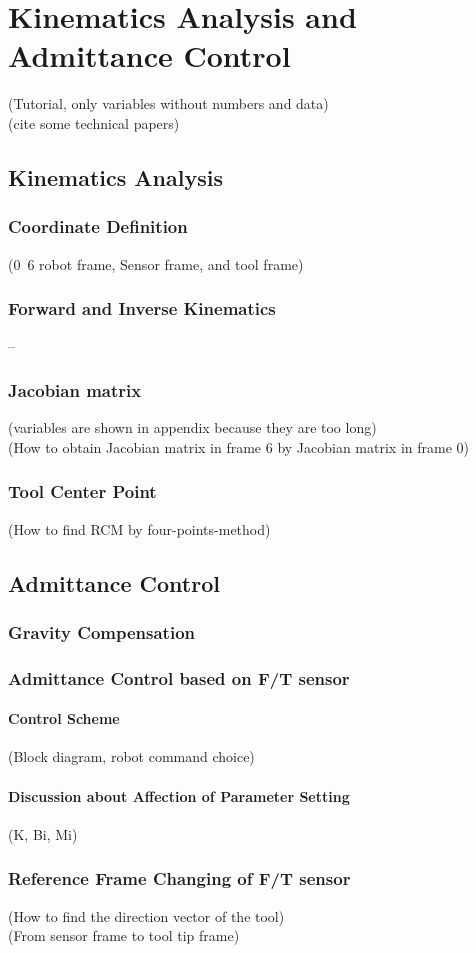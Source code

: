 \chapter{Kinematics Analysis and Admittance Control}
(Tutorial, only variables without numbers and data) 													\\
(cite some technical papers)						
\section{Kinematics Analysis}
\subsection{Coordinate Definition}
(0~6 robot frame, Sensor frame, and tool frame)
\subsection{Forward and Inverse Kinematics}
--
\subsection{Jacobian matrix} 
(variables are shown in appendix because they are too long)												\\
(How to obtain Jacobian matrix in frame 6 by Jacobian matrix in frame 0)								
\subsection{Tool Center Point}
(How to find RCM by four-points-method)
\section{Admittance Control}
\subsection{Gravity Compensation}
\subsection{Admittance Control based on F/T sensor}
\subsubsection{Control Scheme}
(Block diagram, robot command choice)
\subsubsection{Discussion about Affection of Parameter Setting}
(K, Bi, Mi)
\subsection{Reference Frame Changing of F/T sensor}
(How to find the direction vector of the tool)															\\
(From sensor frame to tool tip frame)